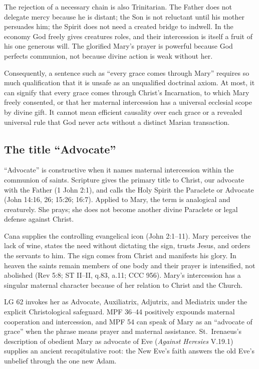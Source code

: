The rejection of a necessary chain is also Trinitarian. The Father does not delegate mercy because he is distant; the Son is not reluctant until his mother persuades him; the Spirit does not need a created bridge to indwell. In the economy God freely gives creatures roles, and their intercession is itself a fruit of his one generous will. The glorified Mary's prayer is powerful because God perfects communion, not because divine action is weak without her.

Consequently, a sentence such as ``every grace comes through Mary'' requires so much qualification that it is unsafe as an unqualified doctrinal axiom. At most, it can signify that every grace comes through Christ's Incarnation, to which Mary freely consented, or that her maternal intercession has a universal ecclesial scope by divine gift. It cannot mean efficient causality over each grace or a revealed universal rule that God never acts without a distinct Marian transaction.

\subsection{The title ``Advocate''}

``Advocate'' is constructive when it names maternal intercession within the communion of saints. Scripture gives the primary title to Christ, our advocate with the Father (1 John 2:1), and calls the Holy Spirit the Paraclete or Advocate (John 14:16, 26; 15:26; 16:7). Applied to Mary, the term is analogical and creaturely. She prays; she does not become another divine Paraclete or legal defense against Christ.

Cana supplies the controlling evangelical icon (John 2:1--11). Mary perceives the lack of wine, states the need without dictating the sign, trusts Jesus, and orders the servants to him. The sign comes from Christ and manifests his glory. In heaven the saints remain members of one body and their prayer is intensified, not abolished (Rev 5:8; ST II--II, q.83, a.11; CCC 956). Mary's intercession has a singular maternal character because of her relation to Christ and the Church.

LG 62 invokes her as Advocate, Auxiliatrix, Adjutrix, and Mediatrix under the explicit Christological safeguard. MPF 36--44 positively expounds maternal cooperation and intercession, and MPF 54 can speak of Mary as an ``advocate of grace'' when the phrase means prayer and maternal assistance. St.~Irenaeus's description of obedient Mary as advocate of Eve (\emph{Against Heresies} V.19.1) supplies an ancient recapitulative root: the New Eve's faith answers the old Eve's unbelief through the one new Adam.

